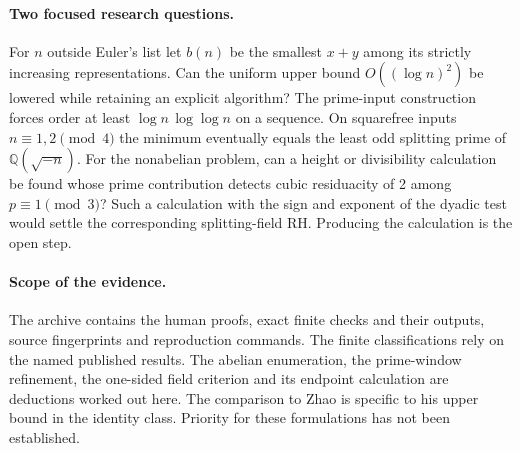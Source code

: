 \documentclass[11pt]{article}
\newcommand{\Q}{\mathbb Q}\newcommand{\R}{\mathbb R}
\begin{document}
\paragraph{Two focused research questions.}
For $n$ outside Euler's list let $b(n)$ be the smallest $x+y$ among its strictly increasing representations. Can the uniform upper bound $O((\log n)^2)$ be lowered while retaining an explicit algorithm? The prime-input construction forces order at least $\log n\,\log\log n$ on a sequence. On squarefree inputs $n\equiv1,2\pmod4$ the minimum eventually equals the least odd splitting prime of $\Q(\sqrt{-n})$. For the nonabelian problem, can a height or divisibility calculation be found whose prime contribution detects cubic residuacity of 2 among $p\equiv1\pmod3$? Such a calculation with the sign and exponent of the dyadic test would settle the corresponding splitting-field RH. Producing the calculation is the open step.

\paragraph{Scope of the evidence.}
The archive contains the human proofs, exact finite checks and their outputs, source fingerprints and reproduction commands. The finite classifications rely on the named published results. The abelian enumeration, the prime-window refinement, the one-sided field criterion and its endpoint calculation are deductions worked out here. The comparison to Zhao is specific to his upper bound in the identity class. Priority for these formulations has not been established.
\end{document}

